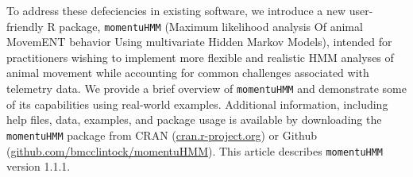 \documentclass[12pt]{article}\usepackage[]{graphicx}\usepackage[]{color}
\begin{document}
To address these defeciencies in existing software, we introduce a new user-friendly R package, \verb|momentuHMM| (Maximum likelihood analysis Of animal MovemENT behavior Using multivariate Hidden Markov Models), intended for practitioners wishing to implement more flexible and realistic HMM analyses of animal movement while accounting for common challenges associated with telemetry data. %
We provide a brief overview of \verb|momentuHMM| and demonstrate some of its capabilities using real-world examples. %
Additional information, including help files, data, examples, and package usage is available by downloading the \verb|momentuHMM| package from CRAN (\url{cran.r-project.org}) or Github (\url{github.com/bmcclintock/momentuHMM}). This article describes \verb|momentuHMM| version 1.1.1.
\end{document}

